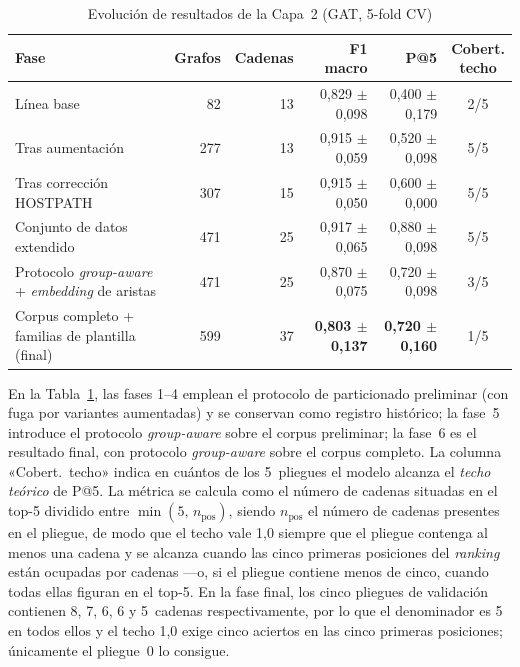\begin{table}[htbp]
\centering\small
\caption{Evolución de resultados de la Capa~2 (\acs{GAT}, 5-fold \acs{CV})}
\label{tab:gnn_evolution}
\begin{tabular}{@{}p{4.3cm}rrrrc@{}}
\toprule
Fase & Grafos & Cadenas & F1 macro & P@5 & \shortstack{Cobert.\\techo} \\
\midrule
Línea base & 82 & 13 & 0,829 \(\pm\) 0,098 & 0,400 \(\pm\) 0,179 & 2/5 \\
Tras aumentación & 277 & 13 & 0,915 \(\pm\) 0,059 & 0,520 \(\pm\) 0,098 & 5/5 \\
Tras corrección HOSTPATH & 307 & 15 & 0,915 \(\pm\) 0,050 & 0,600 \(\pm\) 0,000 & 5/5 \\
Conjunto de datos extendido & 471 & 25 & 0,917 \(\pm\) 0,065 & 0,880 \(\pm\) 0,098 & 5/5 \\
Protocolo \textit{group-aware} + \textit{embedding} de aristas
  & 471 & 25 & 0,870 \(\pm\) 0,075 & 0,720 \(\pm\) 0,098 & 3/5 \\
\addlinespace
Corpus completo + familias de plantilla (final)
  & 599 & 37 & \textbf{0,803 \(\pm\) 0,137} & \textbf{0,720 \(\pm\) 0,160} & 1/5 \\
\bottomrule
\end{tabular}
\fuentepropia
\end{table}

En la Tabla~\ref{tab:gnn_evolution}, las fases 1--4 emplean el protocolo de
particionado preliminar (con fuga por variantes aumentadas) y se conservan como
registro histórico; la fase~5 introduce el protocolo \textit{group-aware} sobre el
corpus preliminar; la fase~6 es el resultado final, con protocolo
\textit{group-aware} sobre el corpus completo.
La columna «Cobert.\ techo» indica en cuántos de los 5~pliegues el modelo alcanza
el \emph{techo teórico} de P@5. La métrica se calcula como el número de cadenas
situadas en el top-5 dividido entre \(\min(5,\, n_{\text{pos}})\), siendo
\(n_{\text{pos}}\) el número de cadenas presentes en el pliegue, de modo que el
techo vale 1,0 siempre que el pliegue contenga al menos una cadena y se alcanza
cuando las cinco primeras posiciones del \textit{ranking} están ocupadas por
cadenas —o, si el pliegue contiene menos de cinco, cuando todas ellas figuran en
el top-5. En la fase final, los cinco pliegues de validación contienen 8, 7, 6, 6
y 5~cadenas respectivamente, por lo que el denominador es 5 en todos ellos y el
techo 1,0 exige cinco aciertos en las cinco primeras posiciones; únicamente el
pliegue~0 lo consigue.

